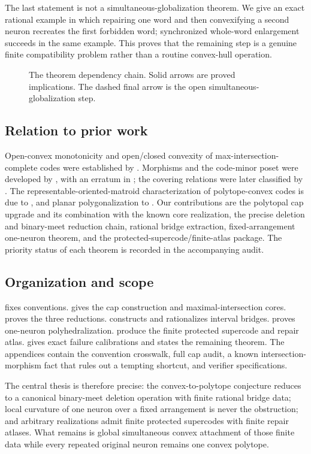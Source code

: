 The last statement is not a simultaneous-globalization theorem.  We give an exact rational example in which repairing one word and then convexifying a second neuron recreates the first forbidden word; synchronized whole-word enlargement succeeds in the same example.  This proves that the remaining step is a genuine finite compatibility problem rather than a routine convex-hull operation.

\begin{figure}[t]
\centering

\caption{The theorem dependency chain.  Solid arrows are proved implications.  The dashed final arrow is the open simultaneous-globalization step.}
\label{fig:dependency}
\end{figure}

\subsection*{Relation to prior work}
Open-convex monotonicity and open/closed convexity of max-intersection-complete codes were established by \citet{CruzEtAl2019}.  Morphisms and the code-minor poset were developed by \citet{Jeffs2020}, with an erratum in \citet{JeffsErratum2022}; the covering relations were later classified by \citet{JeffsTrang2025}.  The representable-oriented-matroid characterization of polytope-convex codes is due to \citet{KuninLienkaemperRosen2023}, and planar polygonalization to \citet{BukhJeffs2023}.  Our contributions are the polytopal cap upgrade and its combination with the known core realization, the precise deletion and binary-meet reduction chain, rational bridge extraction, fixed-arrangement one-neuron theorem, and the protected-supercode/finite-atlas package.  The priority status of each theorem is recorded in the accompanying audit.

\subsection*{Organization and scope}
 fixes conventions.   gives the cap construction and maximal-intersection cores.   proves the three reductions.   constructs and rationalizes interval bridges.   proves one-neuron polyhedralization.   produce the finite protected supercode and repair atlas.   gives exact failure calibrations and states the remaining theorem.  The appendices contain the convention crosswalk, full cap audit, a known intersection-morphism fact that rules out a tempting shortcut, and verifier specifications.

The central thesis is therefore precise: the convex-to-polytope conjecture reduces to a canonical binary-meet deletion operation with finite rational bridge data; local curvature of one neuron over a fixed arrangement is never the obstruction; and arbitrary realizations admit finite protected supercodes with finite repair atlases.  What remains is global simultaneous convex attachment of those finite data while every repeated original neuron remains one convex polytope.
